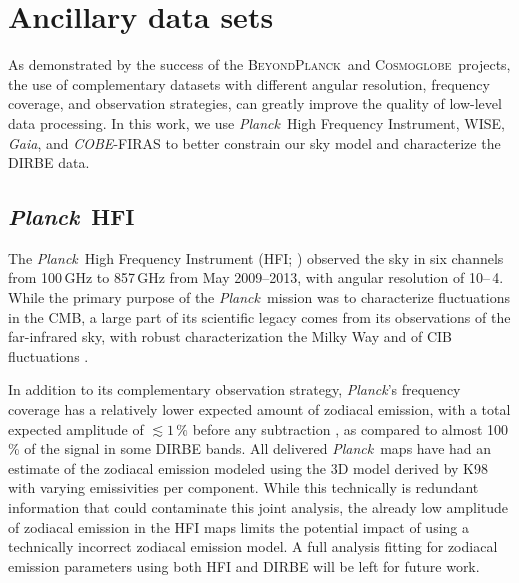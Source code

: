 \documentclass{aa}
\def\Planck{\textit{Planck}}
\def\COBE{\textit{COBE}}
\def\GAIA{\textit{Gaia}}
\def\WISE{WISE}
\newcommand{\bp}{\textsc{BeyondPlanck}}
\newcommand{\cosmoglobe}{\textsc{Cosmoglobe}}
\begin{document}



\section{Ancillary data sets}

As demonstrated by the success of the \bp\ and \cosmoglobe\ projects, the use of complementary datasets with different angular resolution, frequency coverage, and observation strategies, can greatly improve the quality of low-level data processing. In this work, we use \Planck\ High Frequency Instrument, \WISE, \GAIA, and \COBE-FIRAS to better constrain our sky model and characterize the DIRBE data.


\subsection{\Planck\ HFI}


The \Planck\ High Frequency Instrument (HFI; \citealt{planck2016-l03}) observed the sky in six channels from 100\,GHz to 857\,GHz from May 2009--2013, with angular resolution of 10\arcm--\,4\arcm. While the primary purpose of the \Planck\ mission was to characterize fluctuations in the CMB, a large part of its scientific legacy comes from its observations of the far-infrared sky, with robust characterization the Milky Way \citep{planck2013-XVII,planck2014-a12,planck2016-l03} and of CIB fluctuations \citep{planck2014-a12,planck2013-XVII,lenz2019,mccarthy:2024}.

In addition to its complementary observation strategy, \Planck's frequency coverage has a relatively lower expected amount of zodiacal emission, with a total expected amplitude of $\lesssim1\,\%$ before any subtraction \citep{maris2006c,planck2013-pip88}, as compared to almost 100\,\% of the signal in some DIRBE bands. All delivered \Planck\ maps have had an estimate of the zodiacal emission modeled using the 3D model derived by K98 with varying emissivities per component. While this technically is redundant information that could contaminate this joint analysis, the already low amplitude of zodiacal emission in the HFI maps limits the potential impact of using a technically incorrect zodiacal emission model. A full analysis fitting for zodiacal emission parameters using both HFI and DIRBE will be left for future work.
\end{document}
